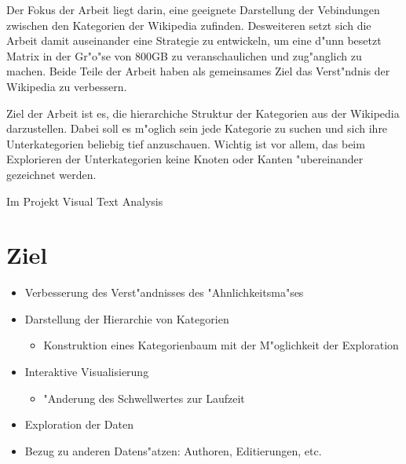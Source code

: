 Der Fokus der Arbeit liegt darin, eine geeignete Darstellung der Vebindungen zwischen den Kategorien der Wikipedia zufinden.
Desweiteren setzt sich die Arbeit damit auseinander eine Strategie zu entwickeln, um eine d"unn besetzt Matrix in der Gr"o"se von 800GB zu veranschaulichen und zug"anglich zu machen.
Beide Teile der Arbeit haben als gemeinsames Ziel das Verst"ndnis der Wikipedia zu verbessern.


Ziel der Arbeit ist es, die hierarchiche Struktur der Kategorien aus der Wikipedia darzustellen.
Dabei soll es m"oglich sein jede Kategorie zu suchen und sich ihre Unterkategorien beliebig tief anzuschauen.
Wichtig ist vor allem, das beim Explorieren der Unterkategorien keine  Knoten oder Kanten "ubereinander gezeichnet werden.

Im  Projekt Visual Text Analysis


\section{Ziel}
\begin{itemize}
    \item Verbesserung des Verst"andnisses des "Ahnlichkeitsma"ses
    \item Darstellung der Hierarchie von Kategorien
    \begin{itemize}
      \item Konstruktion eines Kategorienbaum mit der M"oglichkeit der Exploration
    \end{itemize}
    \item Interaktive Visualisierung
    \begin{itemize}
      \item "Anderung des Schwellwertes zur Laufzeit
    \end{itemize}
    \item Exploration der Daten
    \item Bezug zu anderen Datens"atzen: Authoren, Editierungen, etc.
\end{itemize}















